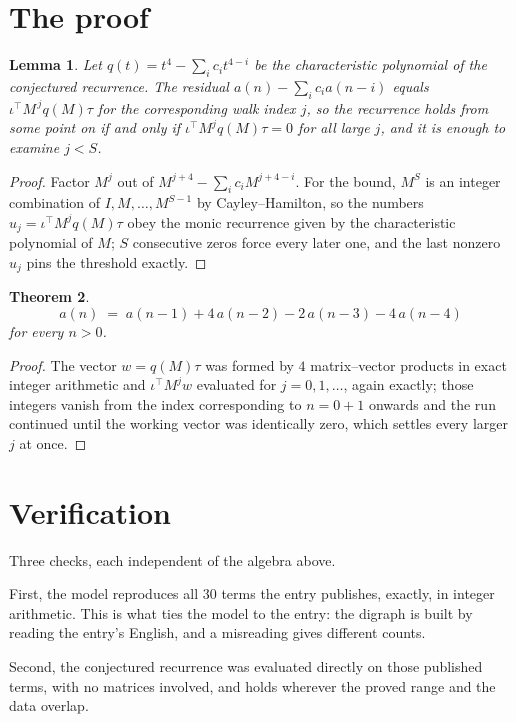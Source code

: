 \documentclass[11pt,a4paper]{article}
\theoremstyle{plain}
\newtheorem{theorem}{Theorem}
\newtheorem{lemma}[theorem]{Lemma}
\theoremstyle{definition}
\begin{document}
\section{The proof}

\begin{lemma}\label{lem:crit}
Let $q(t)=t^{4}-\sum_i c_it^{4-i}$ be the characteristic polynomial of the
conjectured recurrence. The residual $a(n)-\sum_ic_ia(n-i)$ equals
$\iota^{\!\top}M^{\,j}q(M)\tau$ for the corresponding walk index $j$, so the recurrence
holds from some point on if and only if $\iota^{\!\top}M^{j}q(M)\tau=0$ for all large $j$,
and it is enough to examine $j<S$.
\end{lemma}

\begin{proof}
Factor $M^{j}$ out of $M^{j+4}-\sum_ic_iM^{j+4-i}$. For the bound, $M^{S}$
is an integer combination of $I,M,\dots,M^{S-1}$ by Cayley--Hamilton, so the numbers
$u_j=\iota^{\!\top}M^{j}q(M)\tau$ obey the monic recurrence given by the characteristic
polynomial of $M$; $S$ consecutive zeros force every later one, and the last nonzero $u_j$
pins the threshold exactly.
\end{proof}

\begin{theorem}
\[
a(n)\;=\;a(n-1) + 4\,a(n-2) - 2\,a(n-3) - 4\,a(n-4)
\]
for every $n>0$.
\end{theorem}

\begin{proof}
The vector $w=q(M)\tau$ was formed by $4$ matrix--vector products in exact integer
arithmetic and $\iota^{\!\top}M^{j}w$ evaluated for $j=0,1,\dots$, again exactly; those
integers vanish from the index corresponding to $n=0+1$ onwards and the run continued
until the working vector was identically zero, which settles every larger $j$ at once.
\end{proof}

\section{Verification}

Three checks, each independent of the algebra above.

First, the model reproduces all $30$ terms the entry publishes, exactly, in integer
arithmetic. This is what ties the model to the entry: the digraph is built by reading the
entry's English, and a misreading gives different counts.

Second, the conjectured recurrence was evaluated directly on those published terms, with no
matrices involved, and holds wherever the proved range and the data overlap.
\end{document}
